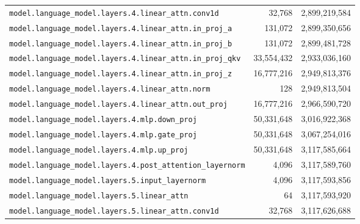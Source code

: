 \documentclass[10pt,a4paper]{article}
\theoremstyle{definition}
\begin{document}
\begin{appendices}
\begin{longtable}{p{9.5cm}rr}
\texttt{model.\allowbreak{}language\_model.\allowbreak{}layers.\allowbreak{}4.\allowbreak{}linear\_attn.\allowbreak{}conv1d} & 32,768 & 2,899,219,584 \\
\texttt{model.\allowbreak{}language\_model.\allowbreak{}layers.\allowbreak{}4.\allowbreak{}linear\_attn.\allowbreak{}in\_proj\_a} & 131,072 & 2,899,350,656 \\
\texttt{model.\allowbreak{}language\_model.\allowbreak{}layers.\allowbreak{}4.\allowbreak{}linear\_attn.\allowbreak{}in\_proj\_b} & 131,072 & 2,899,481,728 \\
\texttt{model.\allowbreak{}language\_model.\allowbreak{}layers.\allowbreak{}4.\allowbreak{}linear\_attn.\allowbreak{}in\_proj\_qkv} & 33,554,432 & 2,933,036,160 \\
\texttt{model.\allowbreak{}language\_model.\allowbreak{}layers.\allowbreak{}4.\allowbreak{}linear\_attn.\allowbreak{}in\_proj\_z} & 16,777,216 & 2,949,813,376 \\
\texttt{model.\allowbreak{}language\_model.\allowbreak{}layers.\allowbreak{}4.\allowbreak{}linear\_attn.\allowbreak{}norm} & 128 & 2,949,813,504 \\
\texttt{model.\allowbreak{}language\_model.\allowbreak{}layers.\allowbreak{}4.\allowbreak{}linear\_attn.\allowbreak{}out\_proj} & 16,777,216 & 2,966,590,720 \\
\texttt{model.\allowbreak{}language\_model.\allowbreak{}layers.\allowbreak{}4.\allowbreak{}mlp.\allowbreak{}down\_proj} & 50,331,648 & 3,016,922,368 \\
\texttt{model.\allowbreak{}language\_model.\allowbreak{}layers.\allowbreak{}4.\allowbreak{}mlp.\allowbreak{}gate\_proj} & 50,331,648 & 3,067,254,016 \\
\texttt{model.\allowbreak{}language\_model.\allowbreak{}layers.\allowbreak{}4.\allowbreak{}mlp.\allowbreak{}up\_proj} & 50,331,648 & 3,117,585,664 \\
\texttt{model.\allowbreak{}language\_model.\allowbreak{}layers.\allowbreak{}4.\allowbreak{}post\_attention\_layernorm} & 4,096 & 3,117,589,760 \\
\texttt{model.\allowbreak{}language\_model.\allowbreak{}layers.\allowbreak{}5.\allowbreak{}input\_layernorm} & 4,096 & 3,117,593,856 \\
\texttt{model.\allowbreak{}language\_model.\allowbreak{}layers.\allowbreak{}5.\allowbreak{}linear\_attn} & 64 & 3,117,593,920 \\
\texttt{model.\allowbreak{}language\_model.\allowbreak{}layers.\allowbreak{}5.\allowbreak{}linear\_attn.\allowbreak{}conv1d} & 32,768 & 3,117,626,688 \\

\end{longtable}
\end{appendices}
\end{document}
